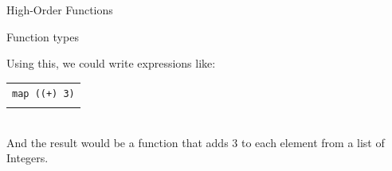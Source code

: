 \documentclass{beamer}
\newcommand{\q}[1]{\texttt{#1}}
\begin{document}
\begin{section}{High-Order Functions}
\begin{subsection}{Function types}
\begin{frame}
        Using this, we could write expressions like:

        \begin{tabular}[c]{l}
          \\
          \q{map ((+) 3)}\\
          \\
          
        \end{tabular}\\
        
        And the result would be a function that adds 3 to each element from a list of Integers.
        

        
     \end{frame}

  \end{subsection}
\end{section}
\end{document}

